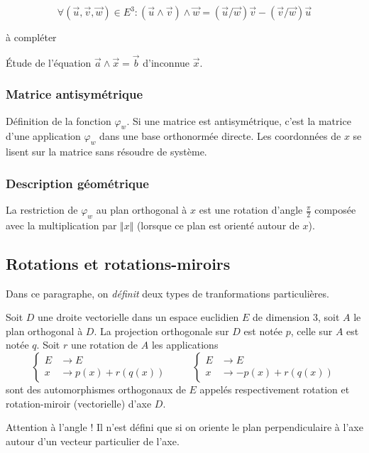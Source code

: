 \begin{propn}
 \begin{displaymath}
 \forall(\overrightarrow u, \overrightarrow v, \overrightarrow w)\in E^3 : 
(\overrightarrow u \wedge \overrightarrow v ) \wedge \overrightarrow w
= (\overrightarrow u / \overrightarrow w )\overrightarrow v 
- (\overrightarrow v / \overrightarrow w )\overrightarrow u
\end{displaymath}
\end{propn}
\begin{demo}
 à compléter
\end{demo}
\'Etude de l'équation $\overrightarrow a \wedge \overrightarrow x =\overrightarrow b$ d'inconnue $\overrightarrow x$.

\subsubsection{Matrice antisymétrique}
Définition de la fonction $\varphi_w$.
Si une matrice est antisymétrique, c'est la matrice d'une application $\varphi_w$ dans une base orthonormée directe. Les coordonnées de $x$ se lisent sur la matrice sans résoudre de système.
\subsubsection{Description géométrique}
La restriction de $\varphi_w$ au plan orthogonal à $x$ est une rotation d'angle $\frac{\pi}{2}$ composée avec la multiplication par $\Vert x\Vert$ (lorsque ce plan est orienté autour de $x$).
\subsection{Rotations et rotations-miroirs}
Dans ce paragraphe, on \emph{définit} deux types de tranformations particulières. 
\begin{propn}
 Soit $D$ une droite vectorielle dans un espace euclidien $E$ de dimension $3$, soit $A$ le plan orthogonal à $D$. La projection orthogonale sur $D$ est notée $p$, celle sur $A$ est notée $q$. Soit $r$ une rotation de $A$ les applications
\begin{displaymath}
 \left\lbrace 
\begin{aligned}
 E &\rightarrow E\\
 x &\rightarrow p(x)+r(q(x))
\end{aligned}
\right. 
\hspace{1cm}
 \left\lbrace 
\begin{aligned}
 E &\rightarrow E\\
 x &\rightarrow -p(x)+r(q(x))
\end{aligned}
\right. 
\end{displaymath}
sont des automorphismes orthogonaux de $E$ appelés respectivement rotation et rotation-miroir (vectorielle) d'axe $D$.
\end{propn}
Attention à l'angle ! Il n'est défini que si on oriente le plan perpendiculaire à l'axe autour d'un vecteur particulier de l'axe.

